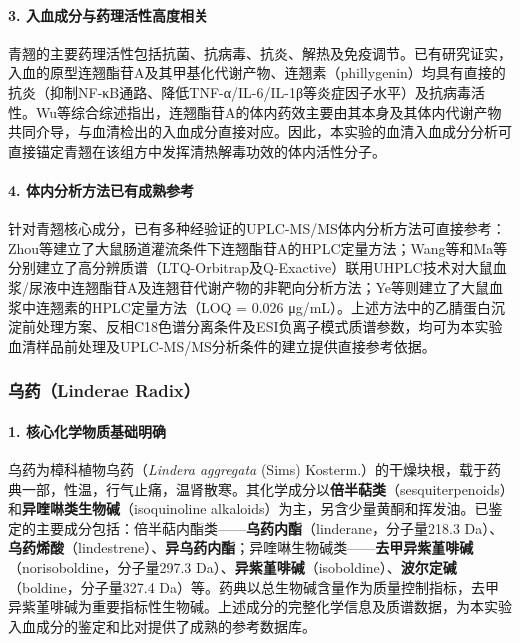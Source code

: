 \documentclass[12pt,a4paper,UTF8,scheme=chinese]{ctexart}
\newcommand{\compoundname}[1]{\textbf{#1}}
\newcommand{\herbname}[1]{\textit{#1}}
\begin{document}
\paragraph{3. 入血成分与药理活性高度相关}

青翘的主要药理活性包括抗菌、抗病毒、抗炎、解热及免疫调节。已有研究证实，入血的原型连翘酯苷A及其甲基化代谢产物、连翘素（phillygenin）均具有直接的抗炎（抑制NF-κB通路、降低TNF-α/IL-6/IL-1β等炎症因子水平）及抗病毒活性。Wu等\cite{Review2021FA}综合综述指出，连翘酯苷A的体内药效主要由其本身及其体内代谢产物共同介导，与血清检出的入血成分直接对应。因此，本实验的血清入血成分分析可直接锚定青翘在该组方中发挥清热解毒功效的体内活性分子。

\paragraph{4. 体内分析方法已有成熟参考}

针对青翘核心成分，已有多种经验证的UPLC-MS/MS体内分析方法可直接参考：Zhou等\cite{Zhou2012}建立了大鼠肠道灌流条件下连翘酯苷A的HPLC定量方法；Wang等\cite{WangF2018}和Ma等\cite{Ma2020}分别建立了高分辨质谱（LTQ-Orbitrap及Q-Exactive）联用UHPLC技术对大鼠血浆/尿液中连翘酯苷A及连翘苷代谢产物的非靶向分析方法；Ye等\cite{Ye2013}则建立了大鼠血浆中连翘素的HPLC定量方法（LOQ = 0.026 μg/mL）。上述方法中的乙腈蛋白沉淀前处理方案、反相C18色谱分离条件及ESI负离子模式质谱参数，均可为本实验血清样品前处理及UPLC-MS/MS分析条件的建立提供直接参考依据。

\subsubsection{乌药（Linderae Radix）}

\paragraph{1. 核心化学物质基础明确}

乌药为樟科植物乌药（\herbname{Lindera aggregata} (Sims) Kosterm.）的干燥块根，载于药典一部，性温，行气止痛，温肾散寒。其化学成分以\textbf{倍半萜类}（sesquiterpenoids）和\textbf{异喹啉类生物碱}（isoquinoline alkaloids）为主，另含少量黄酮和挥发油。已鉴定的主要成分包括：倍半萜内酯类——\compoundname{乌药内酯}（linderane，分子量218.3 Da）、\compoundname{乌药烯酸}（lindestrene）、\compoundname{异乌药内酯}；异喹啉生物碱类——\compoundname{去甲异紫堇啡碱}（norisoboldine，分子量297.3 Da）、\compoundname{异紫堇啡碱}（isoboldine）、\compoundname{波尔定碱}（boldine，分子量327.4 Da）等\cite{Lv2023}。药典以总生物碱含量作为质量控制指标，去甲异紫堇啡碱为重要指标性生物碱。上述成分的完整化学信息及质谱数据，为本实验入血成分的鉴定和比对提供了成熟的参考数据库。
\end{document}
